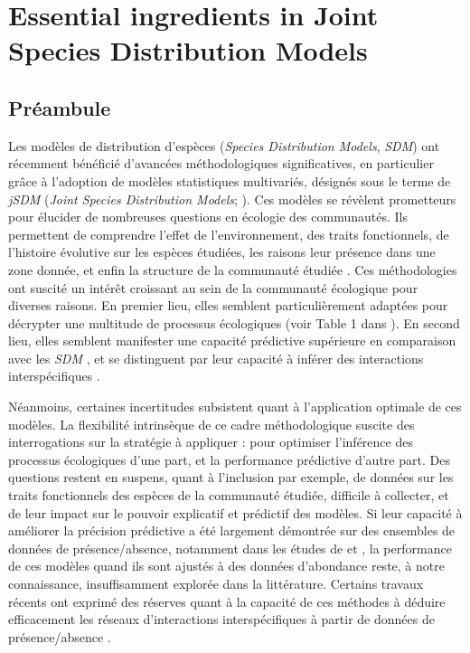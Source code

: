 \begin{refsection}

\hypertarget{essential-ingredients-in-joint-species-distribution-models}{%
\chapter{Essential ingredients in Joint Species Distribution
Models}\label{essential-ingredients-in-joint-species-distribution-models}}

\hypertarget{preambule-chapter1}{%
\section*{Préambule}\label{preambule-chapter1}}

Les modèles de distribution d'espèces (\emph{Species Distribution
Models}, \emph{SDM}) ont récemment bénéficié d'avancées méthodologiques
significatives, en particulier grâce à l'adoption de modèles
statistiques multivariés, désignés sous le terme de \emph{jSDM}
(\emph{Joint Species Distribution Models}; \textcite{Warton_2015}). Ces
modèles se révèlent prometteurs pour élucider de nombreuses questions en
écologie des communautés. Ils permettent de comprendre l'effet de
l'environnement, des traits fonctionnels, de l'histoire évolutive sur
les espèces étudiées, les raisons leur présence dans une zone donnée, et
enfin la structure de la communauté étudiée \autocites[
]{Warton_2015}{Ovaskainen_2017a}. Ces méthodologies ont suscité un
intérêt croissant au sein de la communauté écologique pour diverses
raisons. En premier lieu, elles semblent particulièrement adaptées pour
décrypter une multitude de processus écologiques (voir Table 1 dans
\textcite{Ovaskainen_2017a}). En second lieu, elles semblent manifester
une capacité prédictive supérieure en comparaison avec les \emph{SDM}
\autocite{Norberg_2019}, et se distinguent par leur capacité à inférer
des interactions interspécifiques \autocites[ ]{Warton_2015}[
]{Ovaskainen_2017a}{Ovaskainen_2017b}.

Néanmoins, certaines incertitudes subsistent quant à l'application
optimale de ces modèles. La flexibilité intrinsèque de ce cadre
méthodologique suscite des interrogations sur la stratégie à appliquer :
pour optimiser l'inférence des processus écologiques d'une part, et la
performance prédictive d'autre part. Des questions restent en suspens,
quant à l'inclusion par exemple, de données sur les traits fonctionnels
des espèces de la communauté étudiée, difficile à collecter, et de leur
impact sur le pouvoir explicatif et prédictif des modèles. Si leur
capacité à améliorer la précision prédictive a été largement démontrée
sur des ensembles de données de présence/absence, notamment dans les
études de \textcite{Norberg_2019} et \textcite{Wilkinson_2020}, la
performance de ces modèles quand ils sont ajustés à des données
d'abondance reste, à notre connaissance, insuffisamment explorée dans la
littérature. Certains travaux récents ont exprimé des réserves quant à
la capacité de ces méthodes à déduire efficacement les réseaux
d'interactions interspécifiques à partir de données de présence/absence
\autocites[ ]{Blanchet_2020}[ ]{Violet_2020}{Poggiato_2021}.


\end{refsection}
